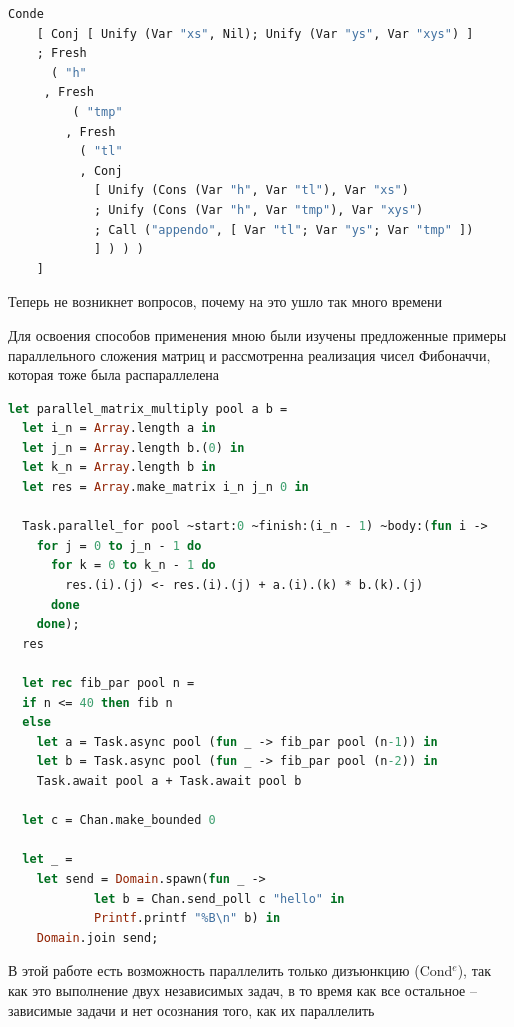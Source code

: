 \begin{lstlisting}[caption=Append$^o$, language=OCaml, frame=single]
  Conde
    [ Conj [ Unify (Var "xs", Nil); Unify (Var "ys", Var "xys") ]
    ; Fresh
      ( "h"
     , Fresh
         ( "tmp"
        , Fresh
          ( "tl"
          , Conj
            [ Unify (Cons (Var "h", Var "tl"), Var "xs")
            ; Unify (Cons (Var "h", Var "tmp"), Var "xys")
            ; Call ("appendo", [ Var "tl"; Var "ys"; Var "tmp" ])
            ] ) ) )
    ]
\end{lstlisting}

Теперь не возникнет вопросов, почему на это ушло так много времени

Для освоения способов применения мною были изучены предложенные примеры параллельного сложения матриц
и рассмотренна реализация чисел Фибоначчи, которая тоже была распараллелена

\begin{lstlisting}[caption=Domainslib, language=OCaml, frame=single]
  let parallel_matrix_multiply pool a b =
  let i_n = Array.length a in
  let j_n = Array.length b.(0) in
  let k_n = Array.length b in
  let res = Array.make_matrix i_n j_n 0 in

  Task.parallel_for pool ~start:0 ~finish:(i_n - 1) ~body:(fun i ->
    for j = 0 to j_n - 1 do
      for k = 0 to k_n - 1 do
        res.(i).(j) <- res.(i).(j) + a.(i).(k) * b.(k).(j)
      done
    done);
  res

  let rec fib_par pool n =
  if n <= 40 then fib n
  else
    let a = Task.async pool (fun _ -> fib_par pool (n-1)) in
    let b = Task.async pool (fun _ -> fib_par pool (n-2)) in
    Task.await pool a + Task.await pool b
  
  let c = Chan.make_bounded 0

  let _ =
    let send = Domain.spawn(fun _ ->
            let b = Chan.send_poll c "hello" in
            Printf.printf "%B\n" b) in
    Domain.join send;
\end{lstlisting}

В этой работе есть возможность параллелить только дизъюнкцию (Cond$^e$), так как это выполнение двух независимых задач,
в то время как все остальное -- зависимые задачи и нет осознания того, как их параллелить

